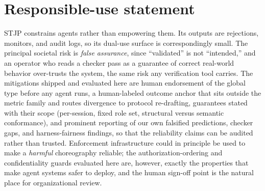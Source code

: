 \documentclass{article}
\newcommand{\stjp}{\textsc{STJP}}
\begin{document}
\section{Responsible-use statement}\label{app:impact}
\stjp{} constrains agents rather than empowering them. Its outputs are rejections, monitors, and audit logs, so its dual-use surface is correspondingly small. The principal societal risk is \emph{false assurance}, since ``validated'' is not ``intended,'' and an operator who reads a checker pass as a guarantee of correct real-world behavior over-trusts the system, the same risk any verification tool carries. The mitigations shipped and evaluated here are human endorsement of the global type before any agent runs, a human-labeled outcome anchor that sits outside the metric family and routes divergence to protocol re-drafting, guarantees stated with their scope (per-session, fixed role set, structural versus semantic conformance), and prominent reporting of our own falsified predictions, checker gaps, and harness-fairness findings, so that the reliability claims can be audited rather than trusted. Enforcement infrastructure could in principle be used to make a \emph{harmful} choreography reliable; the authorization-ordering and confidentiality guards evaluated here are, however, exactly the properties that make agent systems safer to deploy, and the human sign-off point is the natural place for organizational review.
\end{document}
